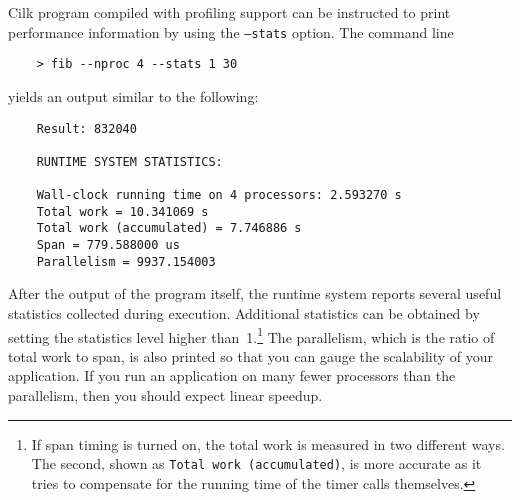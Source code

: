 Cilk program compiled with profiling support can be instructed to
print performance information by using the \texttt{--stats} option.
The command line
\begin{verbatim}
    > fib --nproc 4 --stats 1 30
\end{verbatim}
yields an output similar to the following:
\begin{verbatim}
    Result: 832040

    RUNTIME SYSTEM STATISTICS:

    Wall-clock running time on 4 processors: 2.593270 s
    Total work = 10.341069 s
    Total work (accumulated) = 7.746886 s
    Span = 779.588000 us
    Parallelism = 9937.154003
\end{verbatim}

After the output of the program itself, the runtime system reports
several useful statistics collected during execution.  Additional
statistics can be obtained by setting the statistics level higher
than~1.\footnote{If span timing is turned on, the total work is
measured in two different ways.  The second, shown as {\tt Total work
(accumulated)}, is more accurate as it tries to compensate for the
running time of the timer calls themselves.}  The parallelism, which
is the ratio of total work to span, is also printed so that you can
gauge the scalability of your application.  If you run an application
on many fewer processors than the parallelism, then you should expect
linear speedup.

